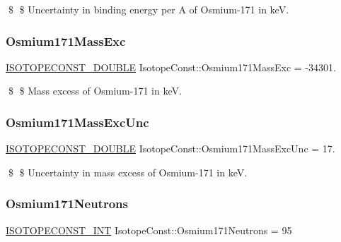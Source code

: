 \$ \$ Uncertainty in binding energy per A of Osmium-\/171 in keV. \mbox{\label{group___isotope_const-_osmium-_os171_gaf9de4f50012fefd77a2df6d858b928e0}} 
\subsubsection{\texorpdfstring{Osmium171\+Mass\+Exc}{Osmium171MassExc}}
{\footnotesize\ttfamily \mbox{\hyperlink{group___isotope_const-_macros_ga8f45a7272ce02c0b4c65c44636ed719a}{I\+S\+O\+T\+O\+P\+E\+C\+O\+N\+S\+T\+\_\+\+D\+O\+U\+B\+LE}} Isotope\+Const\+::\+Osmium171\+Mass\+Exc = -\/34301.}

\$ \$ Mass excess of Osmium-\/171 in keV. \mbox{\label{group___isotope_const-_osmium-_os171_ga5696b6b3fc5e05181dcc842f64578ce4}} 
\subsubsection{\texorpdfstring{Osmium171\+Mass\+Exc\+Unc}{Osmium171MassExcUnc}}
{\footnotesize\ttfamily \mbox{\hyperlink{group___isotope_const-_macros_ga8f45a7272ce02c0b4c65c44636ed719a}{I\+S\+O\+T\+O\+P\+E\+C\+O\+N\+S\+T\+\_\+\+D\+O\+U\+B\+LE}} Isotope\+Const\+::\+Osmium171\+Mass\+Exc\+Unc = 17.}

\$ \$ Uncertainty in mass excess of Osmium-\/171 in keV. \mbox{\label{group___isotope_const-_osmium-_os171_ga5e57bdf36849d54139a8ba37d47f9fb8}} 
\subsubsection{\texorpdfstring{Osmium171\+Neutrons}{Osmium171Neutrons}}
{\footnotesize\ttfamily \mbox{\hyperlink{group___isotope_const-_macros_ga5f18360b3e99483a35c32d789e62621c}{I\+S\+O\+T\+O\+P\+E\+C\+O\+N\+S\+T\+\_\+\+I\+NT}} Isotope\+Const\+::\+Osmium171\+Neutrons = 95}

